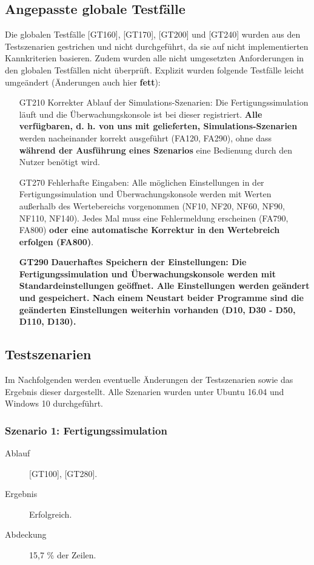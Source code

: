 \documentclass[parskip=full]{scrartcl}
\begin{document}
\subsection{Angepasste globale Testfälle}
Die globalen Testfälle [GT160], [GT170], [GT200] und [GT240] wurden aus den Testszenarien gestrichen und nicht durchgeführt, da sie auf nicht implementierten Kannkriterien basieren.
Zudem wurden alle nicht umgesetzten Anforderungen in den globalen Testfällen nicht überprüft. Explizit wurden folgende Testfälle leicht umgeändert (Änderungen auch hier \textbf{fett}):

\begin{enumerate}
	\item[GT210] Korrekter Ablauf der Simulations-Szenarien: Die Fertigungssimulation läuft und die Überwachungskonsole ist bei dieser registriert. \textbf{Alle verfügbaren, d. h. von uns mit gelieferten, Simulations-Szenarien} werden nacheinander korrekt ausgeführt (FA120, FA290), ohne dass \textbf{während der Ausführung eines Szenarios} eine Bedienung durch den Nutzer benötigt wird.
	\item[GT270] Fehlerhafte Eingaben: Alle möglichen Einstellungen in der Fertigungssimulation und Überwachungskonsole werden mit Werten außerhalb des Wertebereichs vorgenommen (NF10, NF20, NF60, NF90, NF110, NF140). Jedes Mal muss eine Fehlermeldung erscheinen (FA790, FA800) \textbf{oder eine automatische Korrektur in den Wertebreich erfolgen (FA800)}.
	\item[\textbf{GT290}] \textbf{Dauerhaftes Speichern der Einstellungen: Die Fertigungssimulation und Überwachungskonsole werden mit Standardeinstellungen geöffnet. Alle Einstellungen werden geändert und gespeichert. Nach einem Neustart beider Programme sind die geänderten Einstellungen weiterhin vorhanden (D10, D30 - D50, D110, D130).}
\end{enumerate}

\subsection{Testszenarien}
Im Nachfolgenden werden eventuelle Änderungen der Testszenarien sowie das Ergebnis dieser dargestellt. Alle Szenarien wurden unter Ubuntu 16.04 und Windows 10 durchgeführt.

\subsubsection{Szenario 1: Fertigungssimulation}
\begin{description}
	\item[Ablauf] [GT100], [GT280].
	\item[Ergebnis] Erfolgreich.
	\item[Abdeckung] 15,7 \% der Zeilen.
\end{description}
\end{document}

